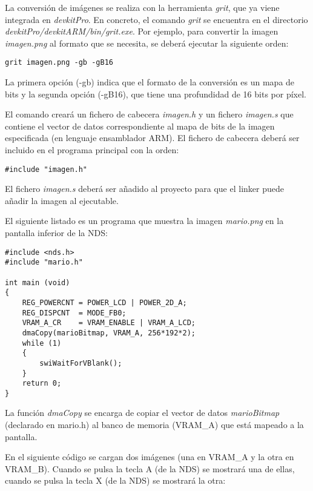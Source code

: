 La conversión de imágenes se realiza con la herramienta \textit{grit}, que ya viene integrada en \textit{devkitPro}. En concreto, el comando \textit{grit} se encuentra en el directorio \textit{devkitPro/devkitARM/bin/grit.exe}. Por ejemplo, para convertir la imagen \textit{imagen.png} al formato que se necesita, se deberá ejecutar la siguiente orden:

\begin{verbatim}
grit imagen.png -gb -gB16
\end{verbatim}

La primera opción (-gb) indica que el formato de la conversión es un mapa de bits y la segunda opción (-gB16), que tiene una profundidad de 16 bits por píxel.

El comando creará un fichero de cabecera \textit{imagen.h} y un fichero \textit{imagen.s} que contiene el vector de datos correspondiente al mapa de bits de la imagen especificada (en lenguaje ensamblador ARM). El fichero de cabecera deberá ser incluido en el programa principal con la orden:

\begin{verbatim}
#include "imagen.h"
\end{verbatim}
	
El fichero \textit{imagen.s} deberá ser añadido al proyecto para que el linker puede añadir la imagen al ejecutable.

El siguiente listado es un programa que muestra la imagen \textit{mario.png} en la pantalla inferior de la NDS:

\begin{lstlisting}
#include <nds.h>
#include "mario.h"

int main (void)
{
	REG_POWERCNT = POWER_LCD | POWER_2D_A;
	REG_DISPCNT  = MODE_FB0;
	VRAM_A_CR    = VRAM_ENABLE | VRAM_A_LCD;
	dmaCopy(marioBitmap, VRAM_A, 256*192*2);
	while (1)
	{
		swiWaitForVBlank();
	}
	return 0;
}
\end{lstlisting}

La función \textit{dmaCopy} se encarga de copiar el vector de datos \textit{marioBitmap} (declarado en mario.h) al banco de memoria (VRAM\_A) que está mapeado a la pantalla.

En el siguiente código se cargan dos imágenes (una en VRAM\_A y la otra en VRAM\_B). Cuando se pulsa la tecla A (de la NDS) se mostrará una de ellas, cuando se pulsa la tecla X (de la NDS) se mostrará la otra:

